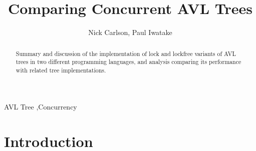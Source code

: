 \documentclass[finalreport,12pt]{elsarticle}
\begin{document}
\begin{frontmatter}



\title{Comparing Concurrent AVL Trees}


\author{Nick Carlson, Paul Iwatake}


\begin{abstract}
Summary and discussion of the implementation of lock and lockfree variants of AVL trees in two different programming languages, and analysis comparing its performance with related tree implementations. 
\end{abstract}

\begin{keyword}
AVL Tree \sep Concurrency 


\end{keyword}

\end{frontmatter}


\section{Introduction}
\label{S:1}
\end{document}
